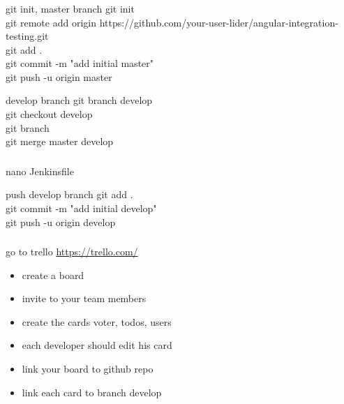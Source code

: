 \documentclass{beamer}
\begin{document}
\begin{frame}\frametitle{} 

\begin{block}{git init, master branch}
git init \\
git remote add origin https://github.com/your-user-lider/angular-integration-testing.git \\
git add . \\

git commit -m "add initial master" \\
git push -u origin master
\end{block}

\begin{block}{develop branch}
git branch develop \\
git checkout develop \\
git branch \\
git merge master develop 
\end{block}

\end{frame}



\begin{frame}\frametitle{} 

\begin{block}{nano Jenkinsfile}
\lstjenkins
\end{block}

\begin{block}{push develop branch}
git add . \\
git commit -m "add initial develop" \\
git push -u origin develop
\end{block}

\end{frame}



\begin{frame}\frametitle{} 

go to trello \url {https://trello.com/}

\begin{itemize}
\item create a board
\item invite to your team members
\item create the cards voter, todos, users
\item each developer should edit his card 
\item link your board to github repo
\item link each card to branch develop
\end{itemize}

\end{frame}
\end{document}
